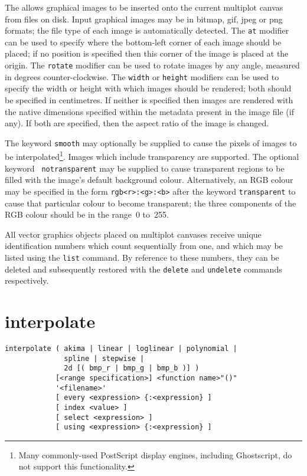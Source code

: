 The  allows graphical images to be inserted onto the current
multiplot canvas from files on disk. Input graphical images may be in bitmap,
gif, jpeg or png formats; the file type of each image is automatically
detected. The {\tt at} modifier can be used to specify where the bottom-left
corner of each image should be placed; if no position is specified then this
corner of the image is placed at the origin. The {\tt rotate} modifier can be
used to rotate images by any angle, measured in degrees counter-clockwise.  The
{\tt width} or {\tt height} modifiers can be used to specify the width or
height with which images should be rendered; both should be specified in
centimetres. If neither is specified then images are rendered with the native
dimensions specified within the metadata present in the image file (if any). If
both are specified, then the aspect ratio of the image is changed.

The keyword {\tt smooth} may optionally be supplied to cause the pixels of
images to be interpolated\footnote{Many commonly-used PostScript display
engines, including Ghostscript, do not support this functionality.}.  Images
which include transparency are supported. The optional keyword {\tt
notransparent} may be supplied to cause transparent regions to be filled with
the image's default background colour. Alternatively, an RGB colour may be
specified in the form {\tt rgb<r>:<g>:<b>} after the keyword {\tt transparent}
to cause that particular colour to become transparent; the three components of
the RGB colour should be in the range~0 to~255.

All vector graphics objects placed on multiplot canvases receive unique
identification numbers which count sequentially from one, and which may be
listed using the {\tt list} command.  By reference to these numbers, they can
be deleted and subsequently restored with the {\tt delete} and {\tt undelete}
commands respectively.


\section{interpolate}

\begin{verbatim}
interpolate ( akima | linear | loglinear | polynomial |
              spline | stepwise |
              2d [( bmp_r | bmp_g | bmp_b )] )
            [<range specification>] <function name>"()"
            '<filename>'
            [ every <expression> {:<expression} ]
            [ index <value> ]
            [ select <expression> ]
            [ using <expression> {:<expression} ]
\end{verbatim}

